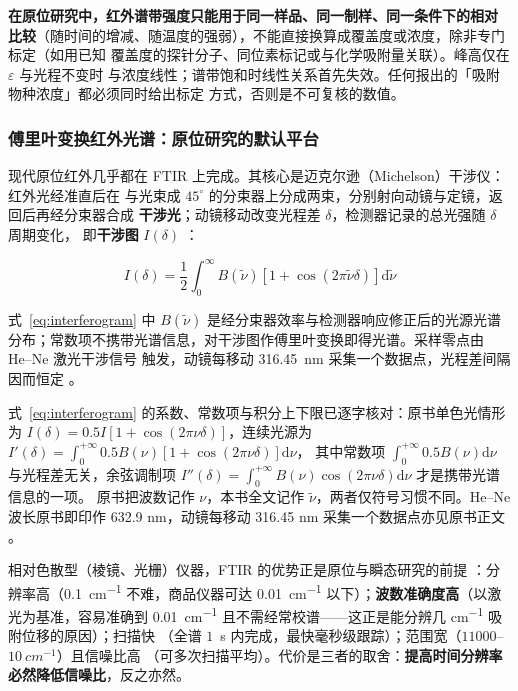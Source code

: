 \begin{keycond}
\textbf{在原位研究中，红外谱带强度只能用于\textbf{同一样品、同一制样、同一条件}下的相对
比较}（随时间的增减、随温度的强弱），不能直接换算成覆盖度或浓度，除非专门标定（如用已知
覆盖度的探针分子、同位素标记或与化学吸附量关联）。峰高仅在 $\varepsilon$ 与光程不变时
与浓度线性；谱带饱和时线性关系首先失效。任何报出的「吸附物种浓度」都必须同时给出标定
方式，否则是不可复核的数值。
\end{keycond}

\subsubsection{傅里叶变换红外光谱：原位研究的默认平台}

现代原位红外几乎都在 FTIR 上完成。其核心是迈克尔逊（Michelson）干涉仪：红外光经准直后在
与光束成 $45^{\circ}$ 的分束器上分成两束，分别射向动镜与定镜，返回后再经分束器合成
\textbf{干涉光}；动镜移动改变光程差 $\delta$，检测器记录的总光强随 $\delta$ 周期变化，
即\textbf{干涉图} $I(\delta)$ ：

\begin{equation}\label{eq:interferogram}
I(\delta)=\frac{1}{2}\int_{0}^{\infty}B(\tilde{\nu})\left[1+\cos\left(2\pi\tilde{\nu}\delta\right)\right]\mathrm{d}\tilde{\nu}
\end{equation}

式~\eqref{eq:interferogram} 中 $B(\tilde{\nu})$ 是经分束器效率与检测器响应修正后的光源光谱
分布；常数项不携带光谱信息，对干涉图作傅里叶变换即得光谱。采样零点由 He--Ne 激光干涉信号
触发，动镜每移动 \qty{316.45}{nm} 采集一个数据点，光程差间隔因而恒定
。

式~\eqref{eq:interferogram} 的系数、常数项与积分上下限已逐字核对：原书单色光情形为
$I(\delta)=0.5I\left[1+\cos(2\pi\nu\delta)\right]$，连续光源为
$I'(\delta)=\int_{0}^{+\infty}0.5B(\nu)\left[1+\cos(2\pi\nu\delta)\right]\mathrm{d}\nu$，
其中常数项 $\int_{0}^{+\infty}0.5B(\nu)\mathrm{d}\nu$ 与光程差无关，余弦调制项
$I''(\delta)=\int_{0}^{+\infty}B(\nu)\cos(2\pi\nu\delta)\mathrm{d}\nu$ 才是携带光谱信息的一项。
原书把波数记作 $\nu$，本书全文记作 $\tilde{\nu}$，两者仅符号习惯不同。He--Ne 波长原书即印作
632.9 nm，动镜每移动 316.45 nm 采集一个数据点亦见原书正文
。

相对色散型（棱镜、光栅）仪器，FTIR 的优势正是原位与瞬态研究的前提
：分辨率高（\qty{0.1}{cm^{-1}} 不难，商品仪器可达
\qty{0.01}{cm^{-1}} 以下）；\textbf{波数准确度高}（以激光为基准，容易准确到
\qty{0.01}{cm^{-1}} 且不需经常校谱——这正是能分辨几 \unit{cm^{-1}} 吸附位移的原因）；扫描快
（全谱 $1$~s 内完成，最快毫秒级跟踪）；范围宽（$11000$--$\qty{10}{cm^{-1}}$）且信噪比高
（可多次扫描平均）。代价是三者的取舍：\textbf{提高时间分辨率必然降低信噪比}，反之亦然。

